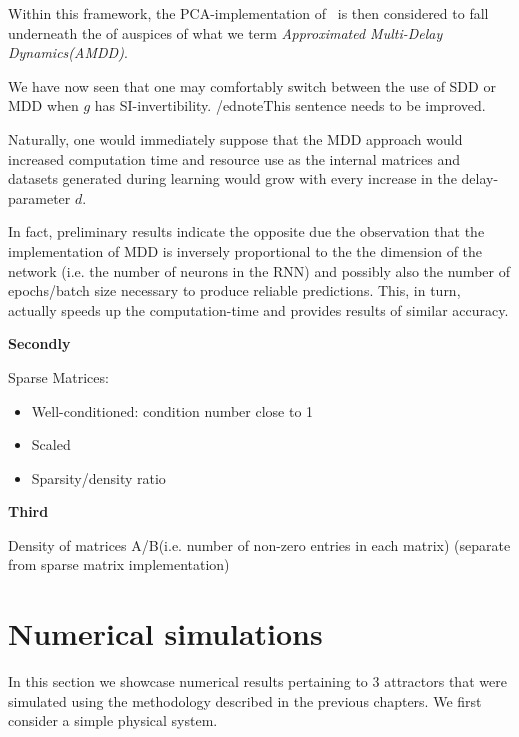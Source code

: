\documentclass[a4paper,12pt,twoside]{report}
\begin{document}
Within this framework, the PCA-implementation of~\cite{manjunath2021universal} is then considered to fall underneath the of auspices of what we term \emph{Approximated Multi-Delay Dynamics(AMDD)}.

We have now seen that one may comfortably switch between the use of SDD or MDD when $g$ has SI-invertibility. /ednote{This sentence needs to be improved.}

Naturally, one would immediately suppose that the MDD approach would increased computation time and resource use as the internal matrices and datasets generated during learning would grow with every increase in the delay-parameter $d$. 

In fact, preliminary results indicate the opposite due the observation that the implementation of MDD is inversely proportional to the the dimension of the network (i.e. the number of neurons in the RNN) and possibly also the number of epochs/batch size necessary to produce reliable predictions. 
This, in turn, actually speeds up the computation-time and provides results of similar accuracy. 

\textbf{Secondly}

Sparse Matrices:
\vspace{-8mm}
\begin{itemize}[noitemsep]
\item Well-conditioned: condition number close to 1
\item Scaled
\item Sparsity/density ratio
\end{itemize}



\textbf{Third}

Density of matrices A/B(i.e. number of non-zero entries in each matrix) (separate from sparse matrix implementation)

\section{Numerical simulations}
In this section we showcase numerical results pertaining to 3 attractors that were simulated using the methodology described in the previous chapters. We first consider a simple physical system.
\end{document}
